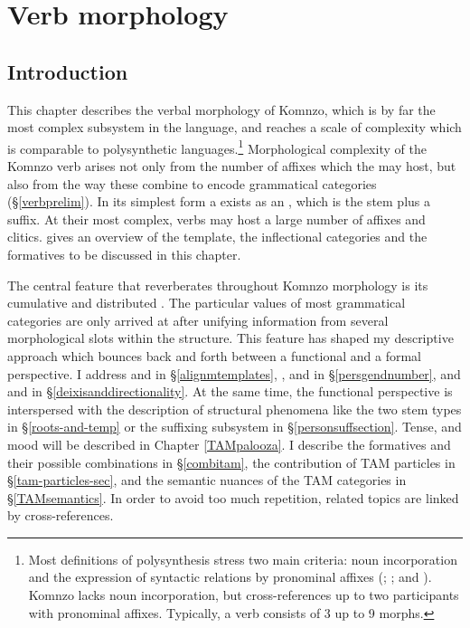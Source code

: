 
\chapter{Verb morphology} \label{cha:verb morphology}

\section{Introduction} \label{verbmorphintro}

This chapter describes the verbal morphology of Komnzo, which is by far the most complex subsystem in the language, and reaches a scale of complexity which is comparable to polysynthetic languages.\footnote{Most definitions of polysynthesis stress two main criteria: noun incorporation and the expression of syntactic relations by pronominal affixes (\citealt[16]{Baker:1996poly}; \citealt[2]{Evans:2002sasse}; and \citealt{Mithun:2009wh}). Komnzo lacks noun incorporation, but cross-references up to two participants with pronominal affixes. Typically, a verb consists of 3 up to 9 morphs.} Morphological complexity of the Komnzo verb arises not only from the number of affixes which the  may host, but also from the way these combine to encode grammatical categories ({\S}\ref{verbprelim}). In its simplest form a  exists as an , which is the stem plus a  suffix. At their most complex, verbs may host a large number of affixes and clitics.  gives an overview of the  template, the inflectional categories and the formatives to be discussed in this chapter.

The central feature that reverberates throughout Komnzo  morphology is its cumulative and distributed . The particular values of most grammatical categories are only arrived at after unifying information from several morphological slots within the  structure. This feature has shaped my descriptive approach which bounces back and forth between a functional and a formal perspective. I address  and  in {\S}\ref{alignmtemplates}, ,  and  in {\S}\ref{persgendnumber}, and  and  in {\S}\ref{deixisanddirectionality}. At the same time, the functional perspective is interspersed with the description of structural phenomena like the two stem types in {\S}\ref{roots-and-temp} or the suffixing subsystem in {\S}\ref{personsuffsection}. Tense,  and mood will be described in Chapter \ref{TAMpalooza}. I describe the formatives and their possible combinations in {\S}\ref{combitam}, the contribution of TAM particles in {\S}\ref{tam-particles-sec}, and the semantic nuances of the TAM categories in {\S}\ref{TAMsemantics}. In order to avoid too much repetition, related topics are linked by cross-references.

